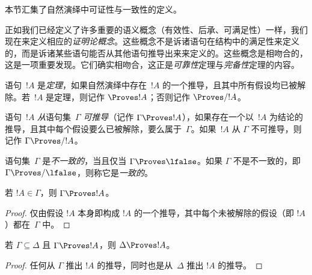 \documentclass[../../../include/open-logic-section]{subfiles}
\begin{document}
      {}
      {}


\begin{editorial}
本节汇集了自然演绎中可证性与一致性的定义。
\end{editorial}

\begin{explain}
正如我们已经定义了许多重要的语义概念（有效性、后承、可满足性）一样，我们现在来定义相应的\emph{证明论概念}。这些概念不是诉诸语句在结构中的满足性来定义的，而是诉诸某些语句能否从其他语句推导出来来定义的。这些概念是相吻合的，这是一项重要发现。它们确实相吻合，这正是\emph{可靠性}定理与\emph{完备性}定理的内容。
\end{explain}

\begin{defn}[定理]
语句~$!A$ 是\emph{定理}，如果自然演绎中存在~$!A$ 的一个推导，且其中所有假设均已被解除。若~$!A$ 是定理，则记作 $\Proves !A$；否则记作 $\Proves/ !A$。
\end{defn}

\begin{defn}[可推导性]
语句~$!A$ \emph{从}语句集~$\Gamma$ \emph{可推导}（记作 $\Gamma \Proves !A$），如果存在一个以~$!A$ 为结论的推导，且其中每个假设要么已被解除，要么属于~$\Gamma$。如果~$!A$ 从 $\Gamma$ 不可推导，则记作 $\Gamma \Proves/ !A$。
\end{defn}

\begin{defn}[一致性]
语句集~$\Gamma$ 是\emph{不一致的}，当且仅当 $\Gamma \Proves \lfalse$。如果 $\Gamma$ 不是不一致的，即 $\Gamma \Proves/ \lfalse$，则称它是\emph{一致的}。
\end{defn}

\begin{prop}[自反性]
若 $!A \in \Gamma$，则 $\Gamma \Proves !A$。
\end{prop}

\begin{proof}
仅由假设 $!A$ 本身即构成 $!A$ 的一个推导，其中每个未被解除的假设（即 $!A$）都在~$\Gamma$ 中。
\end{proof}


\begin{prop}[单调性]
若 $\Gamma \subseteq \Delta$ 且 $\Gamma \Proves !A$，则 $\Delta \Proves !A$。
\end{prop}

\begin{proof}
任何从 $\Gamma$ 推出 $!A$ 的推导，同时也是从~$\Delta$ 推出 $!A$ 的推导。
\end{proof}
\end{document}

